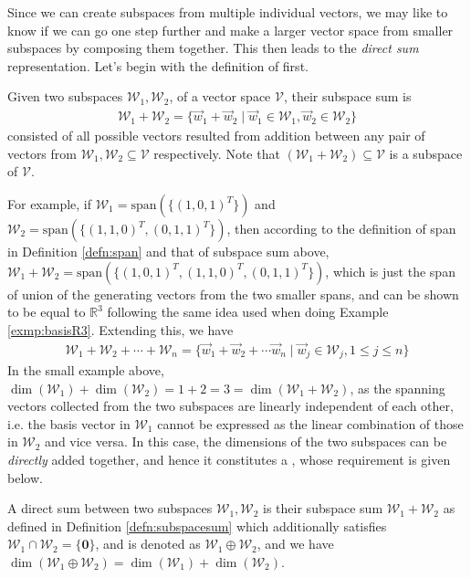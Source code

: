 Since we can create subspaces from multiple individual vectors, we may like to know if we can go one step further and make a larger vector space from smaller subspaces by composing them together. This then leads to the \textit{direct sum} representation. Let's begin with the definition of  first.
\begin{defn}
\label{defn:subspacesum}
Given two subspaces $\mathcal{W}_1, \mathcal{W}_2$, of a vector space $\mathcal{V}$, their subspace sum is
\begin{align*}
\mathcal{W}_1 + \mathcal{W}_2 = \{\vec{w}_1 + \vec{w}_2 \mid \vec{w}_1 \in \mathcal{W}_1, \vec{w}_2 \in \mathcal{W}_2\}    
\end{align*}
consisted of all possible vectors resulted from addition between any pair of vectors from $\mathcal{W}_1, \mathcal{W}_2 \subseteq \mathcal{V}$ respectively. Note that $(\mathcal{W}_1 + \mathcal{W}_2) \subseteq \mathcal{V}$ is a subspace of $\mathcal{V}$.
\end{defn}
For example, if $\mathcal{W}_1 = \text{span}(\{(1,0,1)^T\})$ and $\mathcal{W}_2 = \text{span}(\{(1,1,0)^T, (0,1,1)^T\})$, then according to the definition of span in Definition \ref{defn:span} and that of subspace sum above, $\mathcal{W}_1 + \mathcal{W}_2 = \text{span}(\{(1,0,1)^T, (1,1,0)^T, (0,1,1)^T\})$, which is just the span of union of the generating vectors from the two smaller spans, and can be shown to be equal to $\mathbb{R}^3$ following the same idea used when doing Example \ref{exmp:basisR3}. Extending this, we have
\begin{align*}
\mathcal{W}_1 + \mathcal{W}_2 + \cdots + \mathcal{W}_n = \{\vec{w}_1 + \vec{w}_2 + \cdots \vec{w}_n \mid \vec{w}_j \in \mathcal{W}_j, 1 \leq j \leq n\}    
\end{align*}
In the small example above, $\dim(\mathcal{W}_1) + \dim(\mathcal{W}_2) = 1 + 2 = 3 = \dim(\mathcal{W}_1 + \mathcal{W}_2)$, as the spanning vectors collected from the two subspaces are linearly independent of each other, i.e. the basis vector in $\mathcal{W}_1$ cannot be expressed as the linear combination of those in $\mathcal{W}_2$ and vice versa. In this case, the dimensions of the two subspaces can be \textit{directly} added together, and hence it constitutes a , whose requirement is given below.
\begin{defn}
\label{defn:directsum}
A direct sum between two subspaces $\mathcal{W}_1, \mathcal{W}_2$ is their subspace sum $\mathcal{W}_1 + \mathcal{W}_2$ as defined in Definition \ref{defn:subspacesum} which additionally satisfies $\mathcal{W}_1 \cap \mathcal{W}_2 = \{\textbf{0}\}$, and is denoted as $\mathcal{W}_1 \oplus \mathcal{W}_2$, and we have $\dim(\mathcal{W}_1 \oplus \mathcal{W}_2) = \dim(\mathcal{W}_1) + \dim(\mathcal{W}_2)$.
\end{defn}
